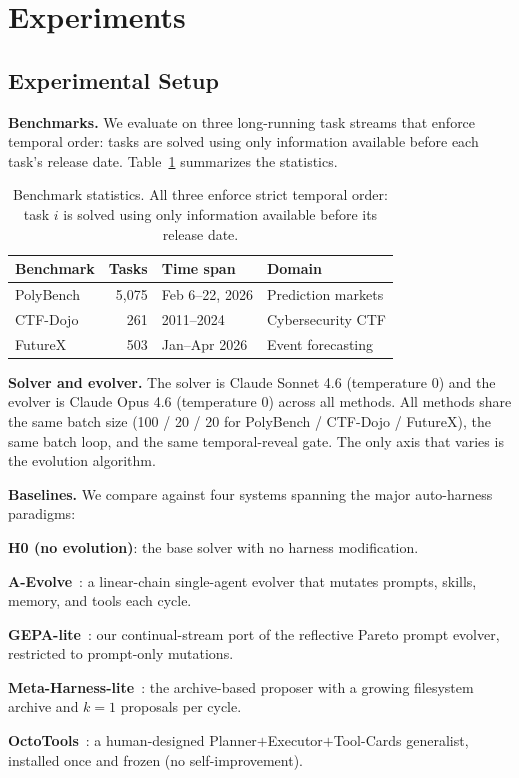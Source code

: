 
\section{Experiments}
\label{sec:experiments}

\subsection{Experimental Setup}
\label{sec:setup}

\noindent\textbf{Benchmarks.} We evaluate on three long-running task streams that enforce temporal order: tasks are solved using only information available before each task's release date. Table~\ref{tab:bench_stats} summarizes the statistics.

\begin{table}[t]
\centering
\small
\setlength{\tabcolsep}{4pt}
\caption{Benchmark statistics. All three enforce strict temporal order: task $i$ is solved using only information available before its release date.}
\label{tab:bench_stats}
\begin{tabular}{lrll}
\toprule
Benchmark & Tasks & Time span & Domain \\
\midrule
PolyBench & 5{,}075 & Feb 6--22, 2026 & Prediction markets \\
CTF-Dojo  & 261   & 2011--2024 & Cybersecurity CTF \\
FutureX   & 503   & Jan--Apr 2026 & Event forecasting \\
\bottomrule
\end{tabular}
\end{table}

\noindent\textbf{Solver and evolver.} The solver is Claude Sonnet 4.6 (temperature 0) and the evolver is Claude Opus 4.6 (temperature 0) across all methods. All methods share the same batch size (100 / 20 / 20 for PolyBench / CTF-Dojo / FutureX), the same batch loop, and the same temporal-reveal gate. The only axis that varies is the evolution algorithm.

\noindent\textbf{Baselines.} We compare against four systems spanning the major auto-harness paradigms:
\begin{compactenum}[$\bullet$]
\item \textbf{H0 (no evolution)}: the base solver with no harness modification.
\item \textbf{A-Evolve}~\cite{aevolve}: a linear-chain single-agent evolver that mutates prompts, skills, memory, and tools each cycle.
\item \textbf{GEPA-lite}~\cite{gepa2025}: our continual-stream port of the reflective Pareto prompt evolver, restricted to prompt-only mutations.
\item \textbf{Meta-Harness-lite}~\cite{metaharness2026}: the archive-based proposer with a growing filesystem archive and $k{=}1$ proposals per cycle.
\item \textbf{OctoTools}~\cite{octotools2026}: a human-designed Planner$+$Executor$+$Tool-Cards generalist, installed once and frozen (no self-improvement).
\end{compactenum}

